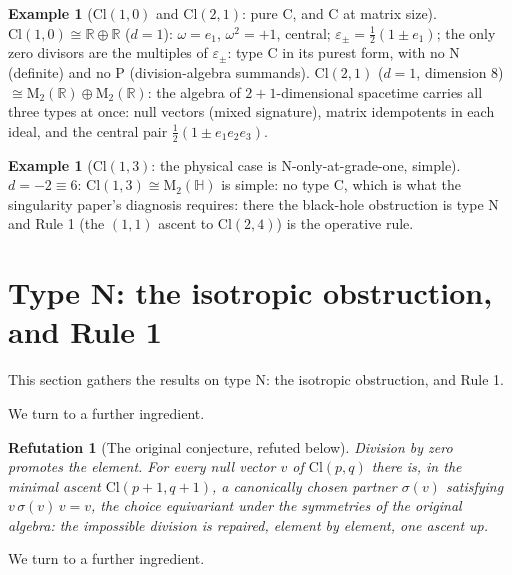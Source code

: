\documentclass[11pt]{article}
\newtheorem{refutation}[theorem]{Refutation}
\theoremstyle{definition}
\newtheorem{example}[theorem]{Example}
\theoremstyle{plain}
\providecommand{\Cl}{}\renewcommand{\Cl}{\mathrm{Cl}}
\providecommand{\HH}{}\renewcommand{\HH}{\mathbb{H}}
\providecommand{\Mat}{}\renewcommand{\Mat}{\mathrm{M}}
\providecommand{\R}{}\renewcommand{\R}{\mathbb{R}}
\begin{document}
\begin{example}[$\Cl(1,0)$ and $\Cl(2,1)$: pure C, and C at matrix size]\label{c:note.transport.cl-1-0-cl-2-1}
$\Cl(1,0) \cong \R \oplus \R$ ($d = 1$): $\omega = e_1$, $\omega^2 = +1$, central; $\varepsilon_\pm = \tfrac12(1 \pm e_1)$; the only zero divisors are the multiples of $\varepsilon_\pm$: type C in its purest form, with no N (definite) and no P (division-algebra summands). $\Cl(2,1)$ ($d = 1$, dimension 8) $\cong \Mat_2(\R) \oplus \Mat_2(\R)$: the algebra of $2{+}1$-dimensional spacetime carries all three types at once: null vectors (mixed signature), matrix idempotents in each ideal, and the central pair $\tfrac12(1 \pm e_1e_2e_3)$.
\end{example}

\begin{example}[$\Cl(1,3)$: the physical case is N-only-at-grade-one, simple]\label{c:note.transport.cl-1-3-physical-case-n}
$d = -2 \equiv 6$: $\Cl(1,3) \cong \Mat_2(\HH)$ is simple: no type C, which is what the singularity paper's diagnosis requires: there the black-hole obstruction is type N and Rule 1 (the $(1,1)$ ascent to $\Cl(2,4)$) is the operative rule.
\end{example}

\section{Type N: the isotropic obstruction, and Rule 1}

This section gathers the results on type N: the isotropic obstruction, and Rule 1.

We turn to a further ingredient.

\begin{refutation}[The original conjecture, refuted below]\label{c:transport.original-conjecture-refuted-below}
Division by zero promotes the element. For every null vector $v$ of $\Cl(p,q)$ there is, in the minimal ascent $\Cl(p{+}1,q{+}1)$, a canonically chosen partner $\sigma(v)$ satisfying $v\,\sigma(v)\,v = v$, the choice equivariant under the symmetries of the original algebra: the impossible division is repaired, element by element, one ascent up.
\end{refutation}

We turn to a further ingredient.
\end{document}
